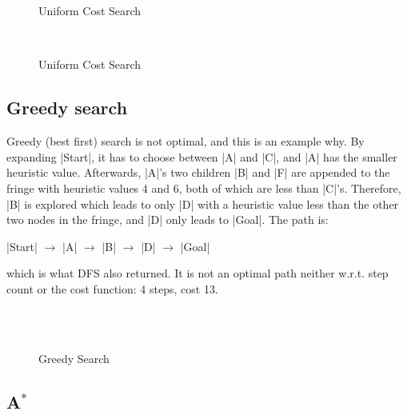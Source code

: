\documentclass{homework}
\begin{document}
\begin{figure}[h!]
    \centering
    \subfloat[Step 1]{}
    \qquad
    \subfloat[Step 2]{}
    \qquad
    \subfloat[Step 3]{}\\
    \subfloat[Step 4]{}\\
    \subfloat[Step 5]{}
    \caption{Uniform Cost Search}
    \label{fig:q2p3ucs_1}
\end{figure}
\begin{figure}[h!]
    \centering
    \subfloat[Step 6]{}\\
    \subfloat[Step 7]{}
    \caption{Uniform Cost Search}
    \label{fig:q2p3ucs_2}
\end{figure}

\clearpage

\subsection{Greedy search}
Greedy (best first) search is not optimal, and this is an example why. By expanding \cverb|Start|, it has to choose between \cverb|A| and \cverb|C|, and \cverb|A| has the smaller heuristic value. Afterwards, \cverb|A|'s two children \cverb|B| and \cverb|F| are appended to the fringe with heuristic values 4 and 6, both of which are less than \cverb|C|'s. Therefore, \cverb|B| is explored which leads to only \cverb|D| with a heuristic value less than the other two nodes in the fringe, and \cverb|D| only leads to \cverb|Goal|. The path is:

\cverb|Start| $\xrightarrow{}$ \cverb|A| $\xrightarrow{}$ \cverb|B| $\xrightarrow{}$ \cverb|D| $\xrightarrow{}$ \cverb|Goal|

which is what DFS also returned. It is not an optimal path neither w.r.t. step count or the cost function: 4 steps, cost 13.

\begin{figure}[h!]
    \centering
    \subfloat[Step 1]{}
    \qquad
    \subfloat[Step 2]{}\\
    \subfloat[Step 3]{}
    \qquad
    \subfloat[Step 4]{}\\
     \caption{Greedy Search}
     \label{fig:q2p4gs_1}
\end{figure}

\clearpage

\subsection{A$^{\ast}$}
\end{document}
